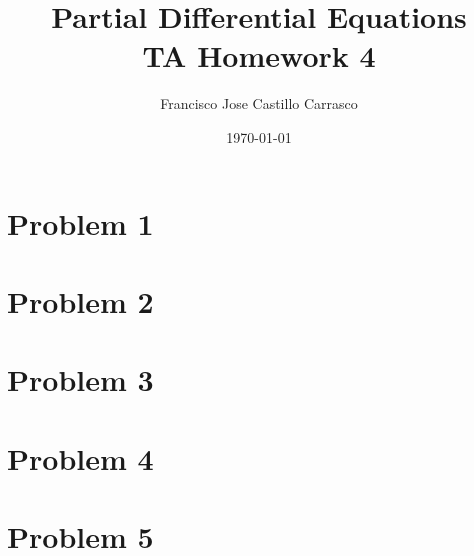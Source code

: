 




\title{Partial Differential Equations\\TA Homework 4}
\author{Francisco Jose Castillo Carrasco}
\date{\today}
\maketitle




\section*{Problem 1}


\section*{Problem 2}


\section*{Problem 3}


\section*{Problem 4}


\section*{Problem 5}



